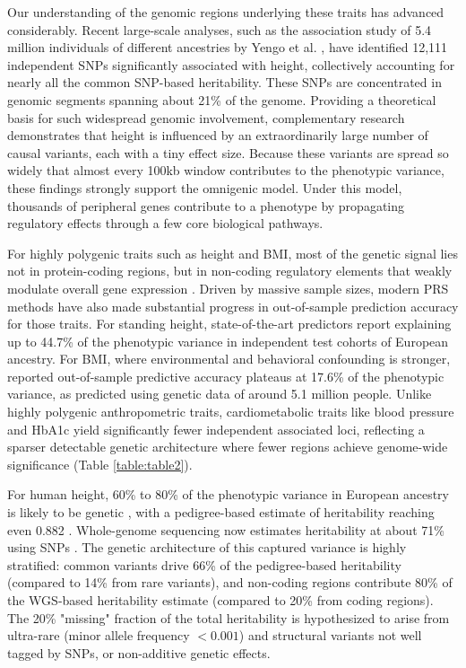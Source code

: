 Our understanding of the genomic regions underlying these traits has advanced considerably. Recent large-scale analyses, such as the association study of 5.4 million individuals of different ancestries by Yengo et al. \cite{HTbig}, have identified 12,111 independent SNPs significantly associated with height, collectively accounting for nearly all the common SNP-based heritability. These SNPs are concentrated in genomic segments spanning about 21\% of the genome. Providing a theoretical basis for such widespread genomic involvement, complementary research \cite{omnigenic} demonstrates that height is influenced by an extraordinarily large number of causal variants, each with a tiny effect size. Because these variants are spread so widely that almost every 100kb window contributes to the phenotypic variance, these findings strongly support the omnigenic model. Under this model, thousands of peripheral genes contribute to a phenotype by propagating regulatory effects through a few core biological pathways.

For highly polygenic traits such as height and BMI, most of the genetic signal lies not in protein-coding regions, but in non-coding regulatory elements that weakly modulate overall gene expression \cite{bmi_noncoding,yengo_meta-analysis_2018}. Driven by massive sample sizes, modern PRS methods have also made substantial progress in out-of-sample prediction accuracy for those traits. For standing height, state-of-the-art predictors report explaining up to 44.7\% \cite{HTbig} of the phenotypic variance in independent test cohorts of European ancestry. For BMI, where environmental and behavioral confounding is stronger, reported out-of-sample predictive accuracy plateaus at 17.6\% \cite{bmi_prs} of the phenotypic variance, as predicted using genetic data of around 5.1 million people. Unlike highly polygenic anthropometric traits, cardiometabolic traits like blood pressure and HbA1c yield significantly fewer independent associated loci, reflecting a sparser detectable genetic architecture where fewer regions achieve genome-wide significance (Table \ref{table:table2}).

For human height, 60\% to 80\% of the phenotypic variance in European ancestry is likely to be genetic \cite{missing_heritability_ht}, with a pedigree-based estimate of heritability reaching even 0.882 \cite{Wainschtein2026}. Whole-genome sequencing now estimates heritability at about 71\% using SNPs \cite{Wainschtein2026}. The genetic architecture of this captured variance is highly stratified: common variants drive 66\% of the pedigree-based heritability (compared to 14\% from rare variants), and non-coding regions contribute 80\% of the WGS-based heritability estimate (compared to 20\% from coding regions). The 20\% "missing" fraction of the total heritability is hypothesized to arise from ultra-rare (minor allele frequency $<0.001$) and structural variants not well tagged by SNPs, or non-additive genetic effects. 

